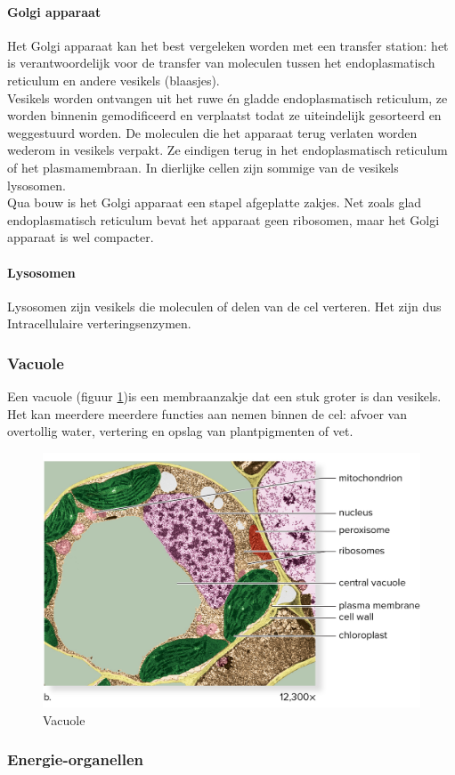 \documentclass[a4paper,kul]{kulakarticle} %
\begin{document}
\paragraph{Golgi apparaat}
Het Golgi apparaat kan het best vergeleken worden met een transfer station: het is verantwoordelijk voor de transfer van moleculen tussen het endoplasmatisch reticulum en andere vesikels (blaasjes). \\
Vesikels worden ontvangen uit het ruwe én gladde endoplasmatisch reticulum, ze worden binnenin gemodificeerd en verplaatst todat ze uiteindelijk gesorteerd en weggestuurd worden. De moleculen die het apparaat terug verlaten worden wederom in vesikels verpakt. Ze eindigen terug in het endoplasmatisch reticulum of het plasmamembraan. In dierlijke cellen zijn sommige van de vesikels lysosomen.  \\
Qua bouw is het Golgi apparaat een stapel afgeplatte zakjes. Net zoals glad endoplasmatisch reticulum bevat het apparaat geen ribosomen, maar het Golgi apparaat is wel compacter.
\paragraph{Lysosomen}
Lysosomen zijn vesikels die moleculen of delen van de cel verteren. Het zijn dus Intracellulaire verteringsenzymen.
\subsubsection{Vacuole}
Een vacuole (figuur \ref{fig:vacuole})is een membraanzakje dat een stuk groter is dan vesikels. Het kan meerdere meerdere functies aan nemen binnen de cel: afvoer van overtollig water, vertering en opslag van plantpigmenten of vet.
\begin{figure}[!h]
	\centering
	\includegraphics[width=0.5\linewidth]{Vacuole}
	\caption[Vacuole]{Vacuole}
	\label{fig:vacuole}
\end{figure}

\subsubsection{Energie-organellen}
\end{document}
